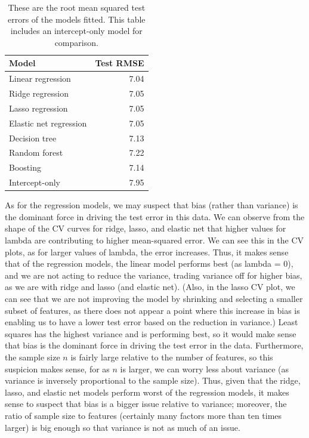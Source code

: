 \documentclass[
]{article}
\begin{document}
\begin{table}[H]

\caption{\label{tab:test-model-evaluation}These are the root mean squared test 
        errors of the models fitted. This table includes 
        an intercept-only model for comparison.}
\centering
\begin{tabular}[t]{lr}
\toprule
Model & Test RMSE\\
\midrule
Linear regression & 7.04\\
Ridge regression & 7.05\\
Lasso regression & 7.05\\
Elastic net regression & 7.05\\
Decision tree & 7.13\\
\addlinespace
Random forest & 7.22\\
Boosting & 7.14\\
Intercept-only & 7.95\\
\bottomrule
\end{tabular}
\end{table}

As for the regression models, we may suspect that bias (rather than variance) is the dominant force in driving the test error in this data. We can observe from the shape of the CV curves for ridge, lasso, and elastic net that higher values for lambda are contributing to higher mean-squared error. We can see this in the CV plots, as for larger values of lambda, the error increases. Thus, it makes sense that of the regression models, the linear model performs best (as lambda = 0), and we are not acting to reduce the variance, trading variance off for higher bias, as we are with ridge and lasso (and elastic net). (Also, in the lasso CV plot, we can see that we are not improving the model by shrinking and selecting a smaller subset of features, as there does not appear a point where this increase in bias is enabling us to have a lower test error based on the reduction in variance.) Least squares has the highest variance and is performing best, so it would make sense that bias is the dominant force in driving the test error in the data. Furthermore, the sample size \(n\) is fairly large relative to the number of features, so this suspicion makes sense, for as \(n\) is larger, we can worry less about variance (as variance is inversely proportional to the sample size). Thus, given that the ridge, lasso, and elastic net models perform worst of the regression models, it makes sense to suspect that bias is a bigger issue relative to variance; moreover, the ratio of sample size to features (certainly many factors more than ten times larger) is big enough so that variance is not as much of an issue.
\end{document}
